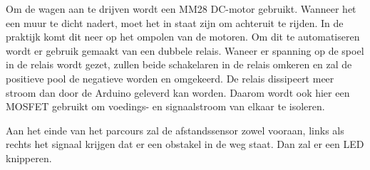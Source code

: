 Om de wagen aan te drijven wordt een MM28 DC-motor gebruikt. Wanneer het een muur te dicht nadert, moet het in staat zijn om achteruit te rijden. In de praktijk komt dit neer op het ompolen van de motoren. Om dit te automatiseren wordt er gebruik gemaakt van een dubbele relais. Waneer er spanning op de spoel in de relais wordt gezet, zullen beide schakelaren in de relais omkeren en zal de positieve pool de negatieve worden en omgekeerd. De relais dissipeert meer stroom dan door de Arduino geleverd kan worden. Daarom wordt ook hier een MOSFET gebruikt om voedings- en signaalstroom van elkaar te isoleren. 

Aan het einde van het parcours zal de afstandssensor zowel vooraan, links als 
rechts het signaal krijgen dat er een obstakel in de weg staat. Dan zal er een 
LED knipperen.

